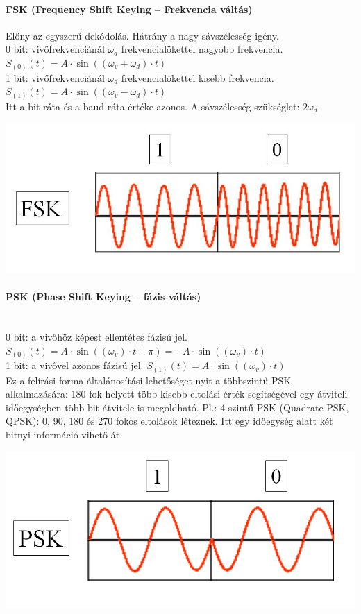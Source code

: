 \paragraph{FSK (Frequency Shift Keying -- Frekvencia váltás)} Előny az egyszerű dekódolás. Hátrány a nagy sávszélesség igény.\\
0 bit: vivőfrekvenciánál $\omega_d$ frekvencialökettel nagyobb frekvencia. $S_{(0)}(t) = A\cdot\sin((\omega_v + \omega_d)\cdot t) $\\
1 bit: vivőfrekvenciánál $\omega_d$ frekvencialökettel kisebb frekvencia. $S_{(1)}(t) = A\cdot\sin((\omega_v - \omega_d)\cdot t) $\\
Itt a bit ráta és a baud ráta értéke azonos. A sávszélesség szükséglet: $2\omega_d$
\begin{center}
	\includegraphics[width=0.25\linewidth]{fig/12-FSK}
\end{center}

\paragraph{PSK (Phase Shift Keying -- fázis váltás)} ~\\
0 bit: a vivőhöz képest ellentétes fázisú jel. $S_{(0)}(t) = A\cdot\sin((\omega_v)\cdot t+\pi)= -A\cdot\sin((\omega_v)\cdot t) $\\
1 bit: a vivővel azonos fázisú jel. $S_{(1)}(t) = A\cdot\sin((\omega_v)\cdot t)$\\
Ez a felírási forma általánosítási lehetőséget nyit a többszintű PSK alkalmazására: 180 fok helyett több kisebb eltolási érték segítségével egy átviteli időegységben több bit átvitele is megoldható.
Pl.: 4 szintű PSK (Quadrate PSK, QPSK): 0, 90, 180 és 270 fokos eltolások léteznek. Itt egy időegység alatt két bitnyi információ vihető át.
\begin{center}
	\includegraphics[width=0.25\linewidth]{fig/12-PSK}
\end{center}

